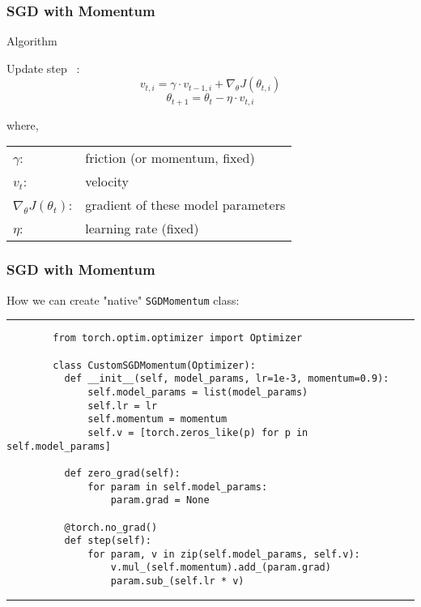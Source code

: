     \begin{frame}
      \frametitle{SGD with Momentum}
      \begin{block}{Algorithm}

        Update step ~\cite{qian1999momentum}:
        \begin{equation}    %
          v_{t,i} = \gamma \cdot v_{t-1,i} + \nabla_{\theta}J(\theta_{t,i})
        \end{equation}
        \begin{equation}    %
          \theta_{t+1} = \theta_{t} - \eta \cdot v_{t,i}
        \end{equation}

        \vskip 0.3cm
        where, \\
        \begin{tabular}{l l}
          $\gamma$: & friction (or momentum, fixed) \\
          $v_{t}$: & velocity \\
          $\nabla_{\theta}J(\theta_t)$: & gradient of these model parameters \\
          $\eta$: & learning rate (fixed)
        \end{tabular}
      \end{block}
    \end{frame}



    \begin{frame}[fragile]
      \frametitle{SGD with Momentum}
      \vspace{0.2cm}
      How we can create "native" \verb|SGDMomentum| class:
      \rule{\textwidth}{1pt}
      \scriptsize
      \begin{verbatim}
        from torch.optim.optimizer import Optimizer

        class CustomSGDMomentum(Optimizer):
          def __init__(self, model_params, lr=1e-3, momentum=0.9):
              self.model_params = list(model_params)
              self.lr = lr
              self.momentum = momentum
              self.v = [torch.zeros_like(p) for p in self.model_params]

          def zero_grad(self):
              for param in self.model_params:
                  param.grad = None

          @torch.no_grad()
          def step(self):
              for param, v in zip(self.model_params, self.v):
                  v.mul_(self.momentum).add_(param.grad)
                  param.sub_(self.lr * v)
      \end{verbatim}
      \rule{\textwidth}{1pt}
    \end{frame}



